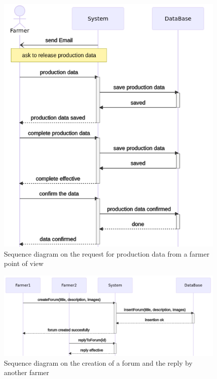 \begin{figure}[H]
	
	\centering
	
	\includegraphics[width=\textwidth]{Images/seq_request_data.png}
	
	\caption{\label{fig:seqrequestdata} Sequence diagram on the request for production data from a farmer point of view}
	
\end{figure}


\begin{figure}[H]
	\centering
	\includegraphics[width=\textwidth]{Images/seq-create-forum.png}
	\caption{\label{fig:seqcreationforum} Sequence diagram on the creation of a forum and the reply by another farmer}
\end{figure}

